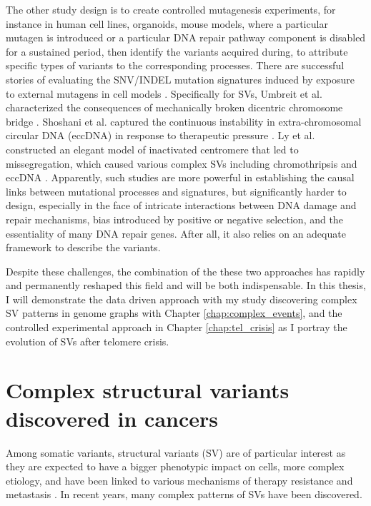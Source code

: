 \documentclass[phd,tocprelim]{cornell}
\begin{document}
The other study design is to create controlled mutagenesis experiments, for instance in human cell lines, organoids, mouse models, where a particular mutagen is introduced or a particular DNA repair pathway component is disabled for a sustained period, then identify the variants acquired during, to attribute specific types of variants to the corresponding processes. There are successful stories of evaluating the SNV/INDEL mutation signatures induced by exposure to external mutagens in cell models \cite{Zou2021-je}. Specifically for SVs, Umbreit et al. characterized the consequences of mechanically broken dicentric chromosome bridge \cite{Umbreit2020-kr}. Shoshani et al. captured the continuous instability in extra-chromosomal circular DNA (eccDNA) in response to therapeutic pressure \cite{Shoshani2020-zj}. Ly et al. constructed an elegant model of inactivated centromere that led to missegregation, which caused various complex SVs including chromothripsis and eccDNA \cite{Ly2019-bt}. Apparently, such studies are more powerful in establishing the causal links between mutational processes and signatures, but significantly harder to design, especially in the face of intricate interactions between DNA damage and repair mechanisms, bias introduced by positive or negative selection, and the essentiality of many DNA repair genes. After all, it also relies on an adequate framework to describe the variants.

Despite these challenges, the combination of the these two approaches has rapidly and permanently reshaped this field and will be both indispensable. In this thesis, I will demonstrate the data driven approach with my study discovering complex SV patterns in genome graphs with Chapter \ref*{chap:complex_events}, and the controlled experimental approach in Chapter \ref*{chap:tel_crisis} as I portray the evolution of SVs after telomere crisis.

\section{Complex structural variants discovered in cancers}
Among somatic variants, structural variants (SV) are of particular interest as they are expected to have a bigger phenotypic impact on cells, more complex etiology, and have been linked to various mechanisms of therapy resistance and metastasis \cite{Wedge2018-nf,Priestley:20196a6}. In recent years, many complex patterns of SVs have been discovered.
\end{document}
